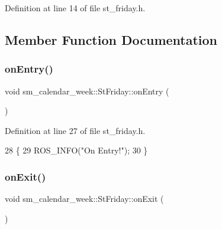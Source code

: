Definition at line 14 of file st\+\_\+friday.\+h.



\subsection{Member Function Documentation}
\mbox{\label{structsm__calendar__week_1_1StFriday_a7ae9cb47276595837bf899e41ab6c03f}} 
\subsubsection{\texorpdfstring{on\+Entry()}{onEntry()}}
{\footnotesize\ttfamily void sm\+\_\+calendar\+\_\+week\+::\+St\+Friday\+::on\+Entry (\begin{DoxyParamCaption}{ }\end{DoxyParamCaption})\hspace{0.3cm}{\ttfamily [inline]}}



Definition at line 27 of file st\+\_\+friday.\+h.


\begin{DoxyCode}
28     \{
29         ROS\_INFO(\textcolor{stringliteral}{"On Entry!"});
30     \}
\end{DoxyCode}
\mbox{\label{structsm__calendar__week_1_1StFriday_a582bb483355ac2ba7038e999d44d4b4e}} 
\subsubsection{\texorpdfstring{on\+Exit()}{onExit()}}
{\footnotesize\ttfamily void sm\+\_\+calendar\+\_\+week\+::\+St\+Friday\+::on\+Exit (\begin{DoxyParamCaption}{ }\end{DoxyParamCaption})\hspace{0.3cm}{\ttfamily [inline]}}



